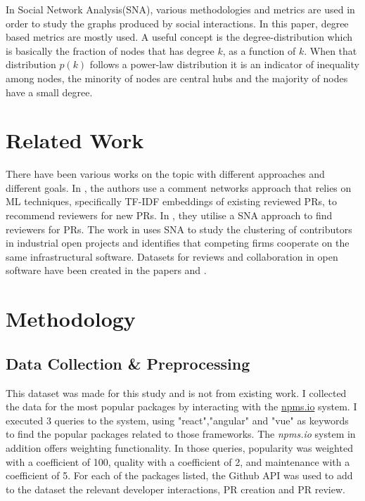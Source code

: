 \documentclass{article}
\begin{document}
In Social Network Analysis(SNA), various methodologies and metrics are used in order to study the graphs produced by social interactions. In this paper, degree based metrics are mostly used. A useful concept is the  degree-distribution which is basically the fraction of nodes that has degree $k$, as a function of $k$. When that distribution $p(k)$ follows a power-law distribution it is an indicator of inequality among nodes, the minority of nodes are central hubs and the majority of nodes have a small degree.

\section{Related Work}
There have been various works on the topic with different approaches and different goals. In \cite{yu_reviewer_2016}, the authors use a comment networks approach that relies on ML techniques, specifically TF-IDF embeddings of existing reviewed PRs, to recommend reviewers for new PRs. In \cite{afsarmanesh_who_2016}, they utilise a SNA approach to find reviewers for PRs. The work in \cite{teixeira_lessons_2015} uses SNA to study the clustering of contributors in industrial open projects and identifies that competing firms cooperate on the same infrastructural software. Datasets for reviews and collaboration in open software have been created in the papers \cite{yang_mining_2016} and \cite{hamasaki_who_2013}.

\section{Methodology}

\subsection{Data Collection \& Preprocessing}
This dataset was made for this study and is not from existing work. I collected the data for the most popular packages by interacting with the \href{https://npms.io/}{npms.io} system.
I executed 3 queries to the system, using "react","angular" and "vue" as keywords to find the popular packages related to those frameworks.
The \emph{npms.io} system in addition offers weighting functionality. In those queries, popularity was weighted with a coefficient of 100, quality with a coefficient of 2, and maintenance with a coefficient of 5.
For each of the packages listed, the Github API was used to add to the dataset the relevant developer interactions, PR creation and PR review. 
\end{document}
